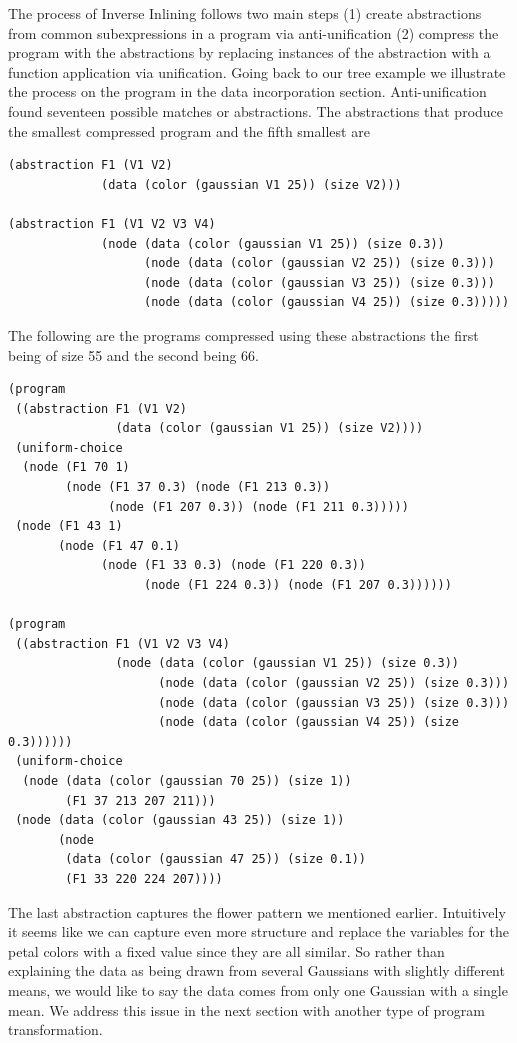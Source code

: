 \documentclass[a4paper,10pt]{article}
\begin{document}
The process of Inverse Inlining follows two main steps (1) create abstractions from common subexpressions in a program via anti-unification (2) compress the program with the abstractions by replacing instances of the abstraction with a function application via unification.  Going back to our tree example we illustrate the process on the program in the data incorporation section.
Anti-unification found seventeen possible matches or abstractions.  The abstractions that produce the smallest compressed program and the fifth smallest are 
\begin{lstlisting}
(abstraction F1 (V1 V2)
             (data (color (gaussian V1 25)) (size V2)))

(abstraction F1 (V1 V2 V3 V4)
             (node (data (color (gaussian V1 25)) (size 0.3))
                   (node (data (color (gaussian V2 25)) (size 0.3)))
                   (node (data (color (gaussian V3 25)) (size 0.3)))
                   (node (data (color (gaussian V4 25)) (size 0.3)))))
\end{lstlisting}
The following are the programs compressed using these abstractions the first being of size 55 and the second being 66.
\begin{lstlisting}
(program
 ((abstraction F1 (V1 V2)
               (data (color (gaussian V1 25)) (size V2))))
 (uniform-choice
  (node (F1 70 1)
        (node (F1 37 0.3) (node (F1 213 0.3))
              (node (F1 207 0.3)) (node (F1 211 0.3)))))
 (node (F1 43 1)
       (node (F1 47 0.1)
             (node (F1 33 0.3) (node (F1 220 0.3))
                   (node (F1 224 0.3)) (node (F1 207 0.3))))))

(program
 ((abstraction F1 (V1 V2 V3 V4)
               (node (data (color (gaussian V1 25)) (size 0.3))
                     (node (data (color (gaussian V2 25)) (size 0.3)))
                     (node (data (color (gaussian V3 25)) (size 0.3)))
                     (node (data (color (gaussian V4 25)) (size 0.3))))))
 (uniform-choice
  (node (data (color (gaussian 70 25)) (size 1))
        (F1 37 213 207 211)))
 (node (data (color (gaussian 43 25)) (size 1))
       (node
        (data (color (gaussian 47 25)) (size 0.1))
        (F1 33 220 224 207))))
\end{lstlisting}
The last abstraction captures the flower pattern we mentioned earlier.  Intuitively it seems like we can capture even more structure and replace the variables for the petal colors with a fixed value since they are all similar.  So rather than explaining the data as being drawn from several Gaussians with slightly different means, we would like to say the data comes from only one Gaussian with a single mean.  We address this issue in the next section with another type of program transformation.
\end{document}
